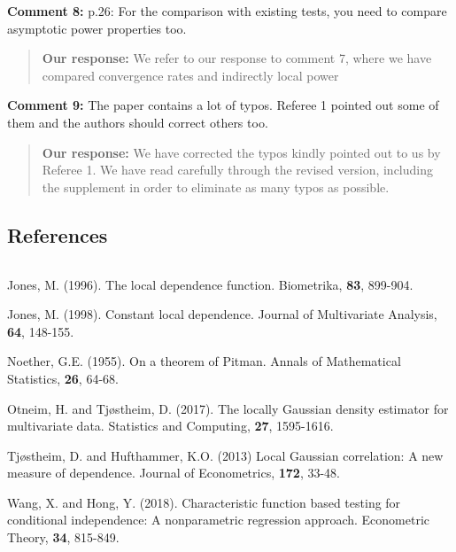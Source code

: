 \documentclass[
  12pt,
  letterpaper]{article}
\numberwithin{equation}{section}
\begin{document}
\textbf{Comment 8:} p.26: For the comparison with existing tests, you need to compare asymptotic power properties too.

\begin{quote}
\textbf{Our response:} We refer to our response to comment 7, where we have compared convergence rates and indirectly local power
\end{quote}

\textbf{Comment 9:} The paper contains a lot of typos. Referee 1 pointed out some of them and the authors should correct others too.

\begin{quote}
\textbf{Our response:} We have corrected the typos kindly pointed out to us by Referee 1. We have read carefully through the revised version, including the supplement in order to eliminate as many typos as possible.
\end{quote}

\hypertarget{references}{%
\subsection{References}\label{references}}

\({ }\)

Jones, M. (1996). The local dependence function. Biometrika, \textbf{83}, 899-904.

Jones, M. (1998). Constant local dependence. Journal of Multivariate Analysis, \textbf{64}, 148-155.

Noether, G.E. (1955). On a theorem of Pitman. Annals of Mathematical Statistics, \textbf{26}, 64-68.

Otneim, H. and Tjøstheim, D. (2017). The locally Gaussian density estimator for multivariate data. Statistics and Computing, \textbf{27}, 1595-1616.

Tjøstheim, D. and Hufthammer, K.O. (2013) Local Gaussian correlation: A new measure of dependence. Journal of Econometrics, \textbf{172}, 33-48.

Wang, X. and Hong, Y. (2018). Characteristic function based testing for conditional independence: A nonparametric regression approach. Econometric Theory, \textbf{34}, 815-849.
\end{document}
